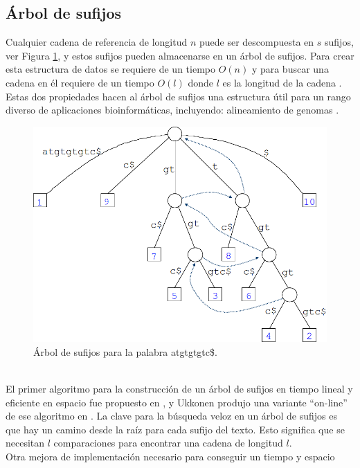 \documentclass[12pt,a4paper]{article}
\begin{document}
\subsection{Árbol de sufijos}
\indent
 Cualquier cadena de referencia de longitud $n$ puede ser descompuesta en $s$ sufijos, ver
 Figura \ref{fig:st}, y estos sufijos pueden almacenarse en un árbol de sufijos.
 Para crear esta estructura de datos se requiere de un tiempo $O(n)$ y para
 buscar una cadena en él requiere de un tiempo $O(l)$ donde $l$ es la longitud
 de la cadena \cite{Gusfield2007Algorithms}. Estas dos propiedades hacen al árbol
 de sufijos una estructura útil para un rango diverso de aplicaciones
 bioinformáticas, incluyendo: alineamiento de genomas \cite{Mummer3}.\\
 \begin{figure}[h] 
   \centering 
   \includegraphics[scale=0.3]{st.png} 
   \caption{Árbol de sufijos para la palabra atgtgtgtc\$.} 
   \label{fig:st} 
 \end{figure}
\\ \indent
El primer algoritmo para la construcción de un árbol de sufijos en tiempo lineal 
y eficiente en espacio fue propuesto en \cite{McCreight:1976:SST:321941.321946}
, y Ukkonen produjo una variante ``on-line'' de ese algoritmo en \cite{Ukkonen1992}. 
La clave para la búsqueda veloz en un árbol de sufijos es que 
hay un camino desde la raíz para cada sufijo del texto. Esto significa que se 
necesitan $l$ comparaciones para encontrar una cadena de longitud $l$.\\
\indent
Otra mejora de implementación necesario para conseguir un tiempo y espacio 
\end{document}
